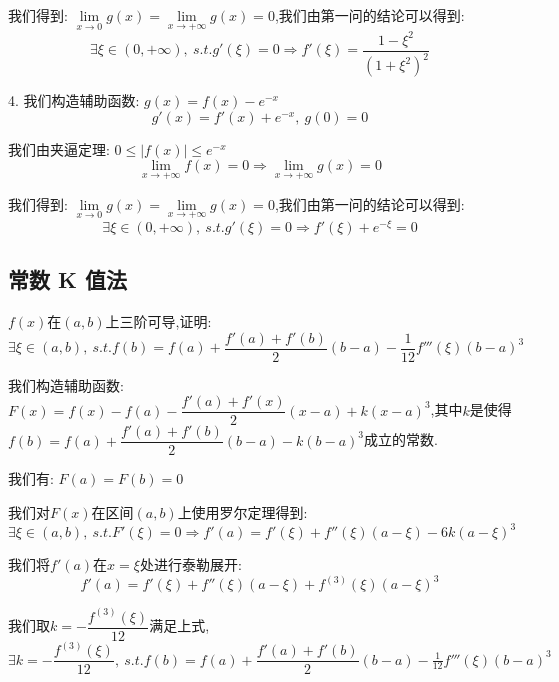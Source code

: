 \begin{solution}
	我们得到: $\lim\limits_{x\rightarrow 0 }g(x)=\lim\limits_{x\rightarrow  +\infty}g(x)=0$,我们由第一问的结论可以得到:
	$$\exists\xi\in(0,+\infty),\ s.t. g'(\xi)=0\Rightarrow f'(\xi)=\dfrac{1-\xi^2}{(1+\xi^2)^2}$$


	4. 我们构造辅助函数: $g(x)=f(x)-e^{-x}$
	$$g'(x)=f'(x)+e^{-x},\ g(0)=0$$

	我们由夹逼定理: $0\leq |f(x)|\leq e^{-x}$
	$$\lim\limits_{x\rightarrow +\infty}f(x)=0\Rightarrow \lim\limits_{x\rightarrow +\infty}g(x)=0$$

	我们得到: $\lim\limits_{x\rightarrow 0 }g(x)=\lim\limits_{x\rightarrow  +\infty}g(x)=0$,我们由第一问的结论可以得到:
	$$\exists\xi\in(0,+\infty),\ s.t. g'(\xi)=0\Rightarrow f'(\xi)+e^{-\xi}=0$$
\end{solution}


\subsection{常数 K 值法}

\begin{proposition}
	$f(x)$在$(a,b)$上三阶可导,证明: $$\exists\xi\in(a,b),\ s.t. f(b)=f(a)+\dfrac{f'(a)+f'(b)}{2}(b-a)-\frac{1}{12}f'''(\xi)(b-a)^3$$
\end{proposition}
\begin{solution}

	我们构造辅助函数: $F(x)=f(x)-f(a)-\dfrac{f'(a)+f'(x)}{2}(x-a)+k(x-a)^3$,其中$k$是使得$f(b)=f(a)+\dfrac{f'(a)+f'(b)}{2}(b-a)-k(b-a)^3$成立的常数.

	我们有: $F(a)=F(b)=0$

	我们对$F(x)$在区间$(a,b)$上使用罗尔定理得到:
	$$\exists\xi\in(a,b),\ s.t. F'(\xi)=0\Rightarrow f'(a)=f'(\xi)+f''(\xi)(a-\xi)-6k(a-\xi)^3$$

	我们将$f'(a)$在$x=\xi$处进行泰勒展开:
	$$f'(a)=f'(\xi)+f''(\xi)(a-\xi)+f^{(3)}(\xi)(a-\xi)^3$$

	我们取$k=-\dfrac{f^{(3)}(\xi)}{12}$满足上式,$\exists k=-\dfrac{f^{(3)}(\xi)}{12},\ s.t. f(b)=f(a)+\dfrac{f'(a)+f'(b)}{2}(b-a)-\frac{1}{12}f'''(\xi)(b-a)^3$

\end{solution}

